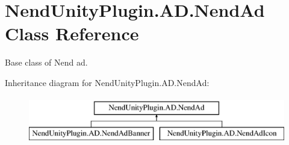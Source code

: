 \hypertarget{class_nend_unity_plugin_1_1_a_d_1_1_nend_ad}{}\section{Nend\+Unity\+Plugin.\+A\+D.\+Nend\+Ad Class Reference}
\label{class_nend_unity_plugin_1_1_a_d_1_1_nend_ad}


Base class of Nend ad.  


Inheritance diagram for Nend\+Unity\+Plugin.\+A\+D.\+Nend\+Ad\+:\begin{figure}[H]
\begin{center}
\leavevmode
\includegraphics[height=2.000000cm]{class_nend_unity_plugin_1_1_a_d_1_1_nend_ad}
\end{center}
\end{figure}
